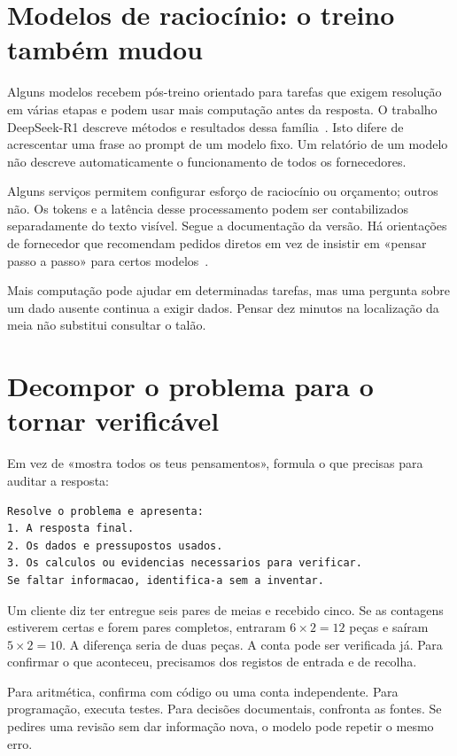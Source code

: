 \section{Modelos de raciocínio: o treino também mudou}
Alguns modelos recebem pós-treino orientado para tarefas que exigem resolução em várias etapas e podem usar mais computação antes da resposta. O trabalho DeepSeek-R1 descreve métodos e resultados dessa família~\citep{deepseek2025}. Isto difere de acrescentar uma frase ao prompt de um modelo fixo. Um relatório de um modelo não descreve automaticamente o funcionamento de todos os fornecedores.

Alguns serviços permitem configurar esforço de raciocínio ou orçamento; outros não. Os tokens e a latência desse processamento podem ser contabilizados separadamente do texto visível. Segue a documentação da versão. Há orientações de fornecedor que recomendam pedidos diretos em vez de insistir em «pensar passo a passo» para certos modelos~\citep{reasoning2026}.

Mais computação pode ajudar em determinadas tarefas, mas uma pergunta sobre um dado ausente continua a exigir dados. Pensar dez minutos na localização da meia não substitui consultar o talão.

\section{Decompor o problema para o tornar verificável}
Em vez de «mostra todos os teus pensamentos», formula o que precisas para auditar a resposta:

\begin{lstlisting}
Resolve o problema e apresenta:
1. A resposta final.
2. Os dados e pressupostos usados.
3. Os calculos ou evidencias necessarios para verificar.
Se faltar informacao, identifica-a sem a inventar.
\end{lstlisting}

\ficcao Um cliente diz ter entregue seis pares de meias e recebido cinco. Se as contagens estiverem certas e forem pares completos, entraram $6 \times 2 = 12$ peças e saíram $5 \times 2 = 10$. A diferença seria de duas peças. A conta pode ser verificada já. Para confirmar o que aconteceu, precisamos dos registos de entrada e de recolha.

Para aritmética, confirma com código ou uma conta independente. Para programação, executa testes. Para decisões documentais, confronta as fontes. Se pedires uma revisão sem dar informação nova, o modelo pode repetir o mesmo erro.

